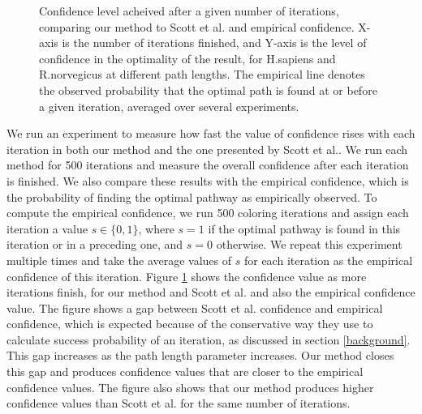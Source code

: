 \begin{figure}[h]
{}
\goodgap
{}
\caption{Confidence level acheived after a given number of iterations,
comparing our method to Scott et al. and empirical confidence. X-axis is the
number of iterations finished, and Y-axis is the level of confidence in the
optimality of the result, for H.sapiens and R.norvegicus at different path
lengths. The empirical line denotes the observed probability that the optimal
path is found at or before a given iteration, averaged over several experiments.}
\label{iterations}
\end{figure}



We run an experiment to measure how fast the value of confidence rises with each
iteration in both our method and the one presented by Scott et al.\cite{scott}.
We run each method for 500 iterations and measure the overall confidence after
each iteration is finished. We also compare these results with the empirical
confidence, which is the probability of finding the optimal pathway as
empirically observed. To compute the empirical confidence, we run 500
coloring iterations and assign each iteration a value $s \in \{0, 1\}$, where
$s = 1$ if the optimal pathway is found in this iteration or in a preceding one,
and $s = 0$ otherwise. We repeat this experiment multiple times and take the
average values of $s$ for each iteration as the empirical confidence of this
iteration. Figure \ref{iterations} shows the confidence value as more iterations
finish, for our method and Scott et al. and also the empirical confidence value.
The figure shows a gap between Scott et al. confidence and empirical confidence,
which is expected because of the conservative way they use to calculate success
probability of an iteration, as discussed in section \ref{background}. This gap
increases as the path length parameter increases. Our method closes this gap and
produces confidence values that are closer to the empirical confidence values.
The figure also shows that our method produces higher confidence values than
Scott et al. for the same number of iterations.

